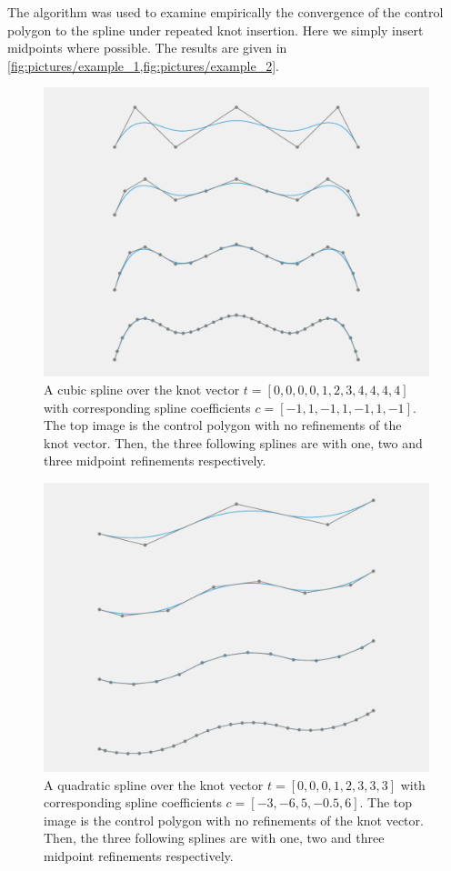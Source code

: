\documentclass{article}
\begin{document}
    The algorithm was used to examine empirically the convergence of the
    control polygon to the spline under repeated knot insertion. Here we simply
    insert midpoints where possible. The results are given in
    \cref{fig:pictures/example_1,fig:pictures/example_2}.
    \begin{figure}[htpb]
        \centering
        \includegraphics[width=0.8\linewidth]{pictures/example_1.pdf}
        \caption{
            A cubic spline over the knot vector $t = [0, 0, 0, 0, 1, 2, 3, 4,
            4, 4, 4]$ with corresponding spline coefficients $c = [-1, 1, -1,
            1, -1, 1, -1]$. The top image is the control polygon with no
            refinements of the knot vector. Then, the three following splines
            are with one, two and three midpoint refinements respectively.
        }
        \label{fig:pictures/example_1} 
    \end{figure}
\begin{figure}[htpb]
        \centering
        \includegraphics[width=0.8\linewidth]{pictures/example_2.pdf}
        \caption{
            A quadratic spline over the knot vector $t = [0, 0, 0, 1, 2, 3, 3,
            3]$ with corresponding spline coefficients $c = [-3, -6, 5, -0.5,
            6]$. The top image is the control polygon with no refinements of
            the knot vector. Then, the three following splines are with one,
            two and three midpoint refinements respectively.
        }
        \label{fig:pictures/example_2} 
    \end{figure}
\end{document}
